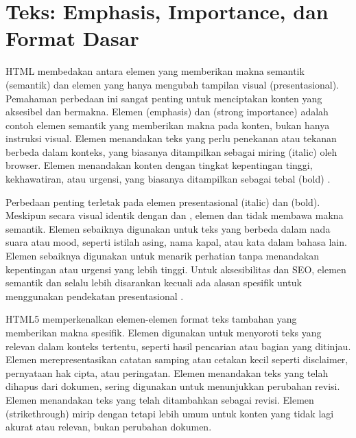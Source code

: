 \section{Teks: Emphasis, Importance, dan Format Dasar}

HTML membedakan antara elemen yang memberikan makna semantik (semantik) dan elemen yang hanya mengubah tampilan visual (presentasional). Pemahaman perbedaan ini sangat penting untuk menciptakan konten yang aksesibel dan bermakna. Elemen  (emphasis) dan  (strong importance) adalah contoh elemen semantik yang memberikan makna pada konten, bukan hanya instruksi visual. Elemen  menandakan teks yang perlu penekanan atau tekanan berbeda dalam konteks, yang biasanya ditampilkan sebagai miring (italic) oleh browser. Elemen  menandakan konten dengan tingkat kepentingan tinggi, kekhawatiran, atau urgensi, yang biasanya ditampilkan sebagai tebal (bold) \cite{mdnHtmlIntro}.

Perbedaan penting terletak pada elemen presentasional  (italic) dan  (bold). Meskipun secara visual identik dengan  dan , elemen  dan  tidak membawa makna semantik. Elemen  sebaiknya digunakan untuk teks yang berbeda dalam nada suara atau mood, seperti istilah asing, nama kapal, atau kata dalam bahasa lain. Elemen  sebaiknya digunakan untuk menarik perhatian tanpa menandakan kepentingan atau urgensi yang lebih tinggi. Untuk aksesibilitas dan SEO, elemen semantik  dan  selalu lebih disarankan kecuali ada alasan spesifik untuk menggunakan pendekatan presentasional \cite{mdnAccessibility}.

HTML5 memperkenalkan elemen-elemen format teks tambahan yang memberikan makna spesifik. Elemen  digunakan untuk menyoroti teks yang relevan dalam konteks tertentu, seperti hasil pencarian atau bagian yang ditinjau. Elemen  merepresentasikan catatan samping atau cetakan kecil seperti disclaimer, pernyataan hak cipta, atau peringatan. Elemen  menandakan teks yang telah dihapus dari dokumen, sering digunakan untuk menunjukkan perubahan revisi. Elemen  menandakan teks yang telah ditambahkan sebagai revisi. Elemen  (strikethrough) mirip dengan  tetapi lebih umum untuk konten yang tidak lagi akurat atau relevan, bukan perubahan dokumen.

